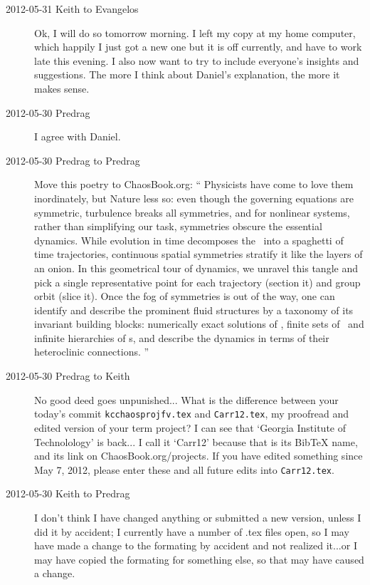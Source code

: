 \begin{description}
\item[2012-05-31 Keith to Evangelos] Ok, I will do so tomorrow morning.  I left my copy at my home computer, which happily I just got a new one but it is off currently, and have to work late this evening.  I also now want to try to include everyone's insights and suggestions.  The more I think about Daniel's explanation, the more it makes sense.

\item[2012-05-30 Predrag] I agree with Daniel.

\item[2012-05-30 Predrag  to Predrag]             \toCB
Move this poetry to ChaosBook.org:
``
Physicists have come to love them inordinately, but Nature less so: even
though the governing equations are symmetric, turbulence breaks all
symmetries, and for nonlinear systems, rather than simplifying our task,
symmetries obscure the essential dynamics.
While evolution in time decomposes the \statesp\ into a spaghetti of time
trajectories, continuous spatial symmetries stratify it like the layers
of an onion. In this geometrical tour of dynamics, we unravel this tangle
and pick a single representative point for each trajectory (section it)
and  group orbit (slice it). Once the fog of symmetries is out of the
way, one can identify and describe the prominent fluid structures by a
taxonomy of its invariant building blocks: numerically exact solutions of
\NSe, finite sets of \reqva\ and infinite hierarchies of \rpo s, and
describe the dynamics in terms of their heteroclinic connections.
''

\item[2012-05-30 Predrag  to Keith] No good deed goes unpunished... What
is the difference between your today's commit \texttt{kcchaosprojfv.tex}
and \texttt{Carr12.tex}, my {\color{red}proofread} and edited version of
your term project? I can see that `Georgia Institute of Technolology' is
back... I call it `Carr12' because that is its BibTeX name, and its link
on ChaosBook.org/projects. If you have edited something since May 7,
2012, please enter these and all future edits into \texttt{Carr12.tex}.

\item[2012-05-30 Keith to Predrag]  I don't think I have changed anything or submitted a new version, unless I did it by accident; I currently have a number of .tex files open, so I may have made a change to the formating by accident and not realized it...or I may have copied the formating for something else, so that may have caused a change.

\end{description}
